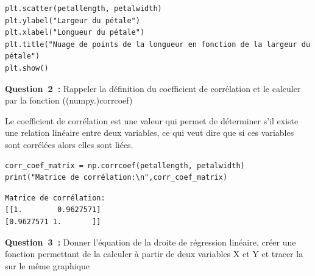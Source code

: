 \begin{lstlisting}[style=myPython, caption=Code Python pour calculer le coefficient de corrélation, frame=lines]
plt.scatter(petallength, petalwidth)
plt.ylabel("Largeur du pétale")
plt.xlabel("Longueur du pétale")
plt.title("Nuage de points de la longueur en fonction de la largeur du pétale")
plt.show()
\end{lstlisting}

\clearpage

\noindent
\textbf{Question~2~:} Rappeler la définition du coefficient de corrélation et le calculer par la fonction ((numpy.)corrcoef)
\vspace{.2cm}

Le coefficient de corrélation est une valeur qui permet de déterminer s'il existe une relation linéaire entre deux variables, ce qui veut dire que si ces variables sont corrélées alors elles sont liées. \\


\begin{lstlisting}[style=myPython, caption=Code Python pour calculer le coefficient de corrélation, frame=lines]
corr_coef_matrix = np.corrcoef(petallength, petalwidth)
print("Matrice de corrélation:\n",corr_coef_matrix)
\end{lstlisting}

\begin{lstlisting}[style=myLog, caption=Résultat du code, frame=lines]
Matrice de corrélation:
[[1.        0.9627571]
[0.9627571 1.       ]]
\end{lstlisting}

\vspace{.5cm}


\noindent
\textbf{Question~3~:} Donner l’équation de la droite de régression linéaire, créer une fonction permettant de la
calculer à partir de deux variables X et Y et tracer la sur le même graphique
\vspace{.2cm}

